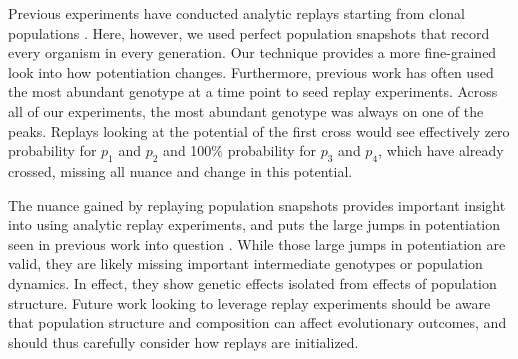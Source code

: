 Previous experiments have conducted analytic replays starting from clonal populations \citep{blountHistoricalContingencyEvolution2008, fergusonPotentiatingMutationsFacilitate2023}. 
Here, however, we used perfect population snapshots that record every organism in every generation. 
Our technique provides a more fine-grained look into how potentiation changes. 
Furthermore, previous work has often used the most abundant genotype at a time point to seed replay experiments. 
Across all of our experiments, the most abundant genotype was always on one of the peaks. %
Replays looking at the potential of the first cross would see effectively zero probability for $p_{1}$ and $p_{2}$ and 100\% probability for $p_{3}$ and $p_{4}$, which have already crossed, missing all nuance and change in this potential. 

The nuance gained by replaying population snapshots provides important insight into using analytic replay experiments, and puts the large jumps in potentiation seen in previous work into question \citep{fergusonPotentiatingMutationsFacilitate2023}.
While those large jumps in potentiation are valid, they are likely missing important intermediate genotypes or population dynamics. 
In effect, they show genetic effects isolated from effects of population structure.
Future work looking to leverage replay experiments should be aware that population structure and composition can affect evolutionary outcomes, and should thus carefully consider how replays are initialized. 

